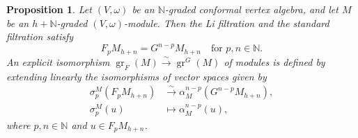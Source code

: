 \documentclass[a4paper, 12pt, reqno]{amsart}
\newtheorem{proposition}[theorem]{Proposition}
\theoremstyle{remark}
\DeclareMathOperator{\gr}{gr}
\begin{document}
\begin{proposition}
  \label{prp:18}
  Let $(V, \omega)$ be an $\mathbb{N}$-graded conformal vertex algebra, and let $M$ be an $h + \mathbb{N}$-graded $(V, \omega)$-module.
  Then the Li filtration and the standard filtration satisfy
  \begin{equation*}
    F_pM_{h + n} = G^{n - p}M_{h + n} \quad \text{for $p, n \in \mathbb{N}$}.
  \end{equation*}
  An explicit isomorphism $\gr_F(M) \xrightarrow{\sim} \gr^G(M)$ of modules is defined by extending linearly the isomorphisms of vector spaces given by
  \begin{align*}
    \sigma^M_p(F_pM_{h + n}) &\xrightarrow{\sim} \alpha^{n - p}_M(G^{n - p}M_{h + n}), \\
    \sigma^M_p(u) &\mapsto \alpha^{n - p}_M(u),
  \end{align*}
  where $p, n \in \mathbb{N}$ and $u \in F_pM_{h + n}$.
\end{proposition}
\end{document}
